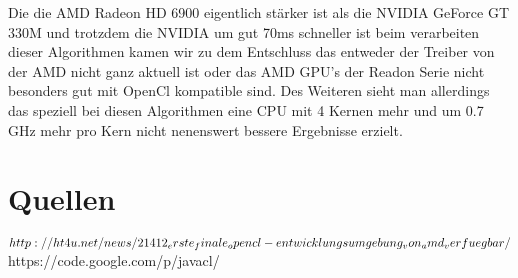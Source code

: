 \documentclass[a4paper,12pt]{scrreprt}
\begin{document}
Die die AMD Radeon HD 6900 eigentlich stärker ist als die NVIDIA GeForce GT 330M und trotzdem die NVIDIA um gut 70ms schneller ist beim verarbeiten dieser Algorithmen kamen wir zu dem Entschluss das entweder der Treiber von der AMD nicht ganz aktuell ist oder das AMD GPU's der Readon Serie nicht besonders gut mit OpenCl kompatible sind.\newline
Des Weiteren sieht man allerdings das speziell bei diesen Algorithmen eine CPU mit 4 Kernen mehr und um 0.7 GHz mehr pro Kern nicht nenenswert bessere Ergebnisse erzielt.


\chapter{Quellen}

$http://ht4u.net/news/21412_erste_finale_opencl-entwicklungsumgebung_von_amd_verfuegbar/\\\\
$https://code.google.com/p/javacl/

	
\end{document}
